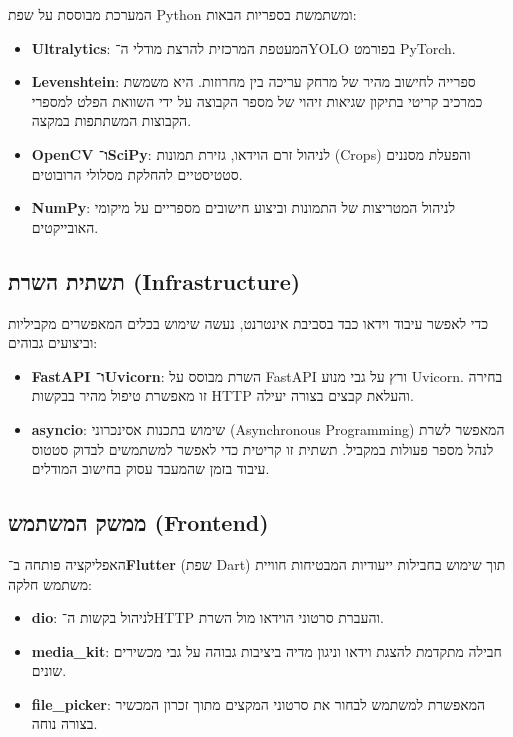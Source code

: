 המערכת
מבוססת על שפת \textenglish{Python} ומשתמשת בספריות הבאות:
\begin{itemize}
\item \textbf{\textenglish{Ultralytics}}: המעטפת המרכזית להרצת
  מודלי ה־\textenglish{YOLO} בפורמט \textenglish{PyTorch}.
\item \textbf{\textenglish{Levenshtein}}: ספרייה לחישוב מהיר של
  מרחק עריכה בין מחרוזות. היא משמשת כמרכיב קריטי בתיקון שגיאות זיהוי של
  מספר הקבוצה על ידי השוואת הפלט למספרי הקבוצות המשתתפות במקצה.
\item \textbf{\textenglish{OpenCV} ו־\textenglish{SciPy}}: לניהול
  זרם הוידאו, גזירת תמונות (\textenglish{Crops}) והפעלת מסננים סטטיסטיים
  להחלקת מסלולי הרובוטים.
\item \textbf{\textenglish{NumPy}}: לניהול המטריצות של התמונות
  וביצוע חישובים מספריים על מיקומי האובייקטים.
\end{itemize}

\subsection{תשתית השרת (\textenglish{Infrastructure})}

כדי לאפשר עיבוד
וידאו כבד בסביבת אינטרנט, נעשה שימוש בכלים המאפשרים מקביליות וביצועים
גבוהים:
\begin{itemize}
\item \textbf{\textenglish{FastAPI} ו־\textenglish{Uvicorn}}: השרת
  מבוסס על \textenglish{FastAPI} ורץ על גבי מנוע
  \textenglish{Uvicorn}. בחירה זו מאפשרת טיפול מהיר בבקשות
  \textenglish{HTTP} והעלאת קבצים בצורה יעילה.
\item \textbf{\textenglish{asyncio}}: שימוש בתכנות אסינכרוני
  (\textenglish{Asynchronous Programming}) המאפשר לשרת לנהל מספר פעולות
  במקביל. תשתית זו קריטית כדי לאפשר למשתמשים לבדוק סטטוס עיבוד בזמן
  שהמעבד עסוק בחישוב המודלים.
\end{itemize}

\subsection{ממשק המשתמש (\textenglish{Frontend})}

האפליקציה פותחה
ב־\textbf{\textenglish{Flutter}} (שפת \textenglish{Dart}) תוך שימוש
בחבילות ייעודיות המבטיחות חוויית משתמש חלקה:
\begin{itemize}
\item \textbf{\textenglish{dio}}: לניהול בקשות
  ה־\textenglish{HTTP} והעברת סרטוני הוידאו מול השרת.
\item \textbf{\textenglish{media\_kit}}: חבילה מתקדמת להצגת וידאו
  וניגון מדיה ביציבות גבוהה על גבי מכשירים שונים.
\item \textbf{\textenglish{file\_picker}}: המאפשרת למשתמש לבחור את
  סרטוני המקצים מתוך זכרון המכשיר בצורה נוחה.
\end{itemize}

